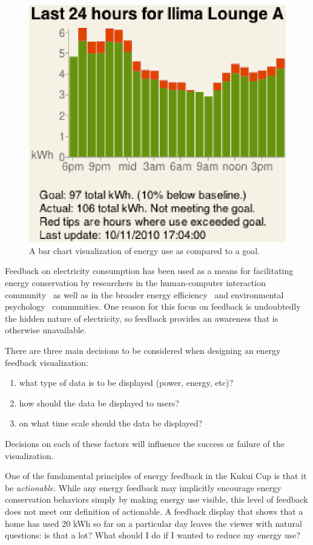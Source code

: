 \documentclass[10pt, conference, compsocconf]{IEEEtran-old}
\begin{document}
\begin{figure}[!tb]
	\centering
	\includegraphics[width=0.9\columnwidth]{energy-24hours-new.eps}
	\caption{A bar chart visualization of energy use as compared to a goal.}
	\label{fig:energy-24hours}
\end{figure}

Feedback on electricity consumption has been used as a means for facilitating energy conservation by researchers in the human-computer interaction community~\cite{Froehlich2010} as well as in the broader energy efficiency~\cite{darby-review-2006, Faruqui09, Foster-2012} and environmental psychology~\cite{Becker78, Houwelingen89} communities. One reason for this focus on feedback is undoubtedly the hidden nature of electricity, so feedback provides an awareness that is otherwise unavailable.

There are three main decisions to be considered when designing an energy feedback visualization:
\begin{enumerate}
	\item what type of data is to be displayed (power, energy, etc)?
	\item how should the data be displayed to users?
	\item on what time scale should the data be displayed?
\end{enumerate}
Decisions on each of these factors will influence the success or failure of the visualization.

One of the fundamental principles of energy feedback in the Kukui Cup is that it be \emph{actionable}. While any energy feedback may implicitly encourage energy conservation behaviors simply by making energy use visible, this level of feedback does not meet our definition of actionable. A feedback display that shows that a home has used 20 kWh so far on a particular day leaves the viewer with natural questions: is that a lot? What should I do if I wanted to reduce my energy use?
\end{document}

